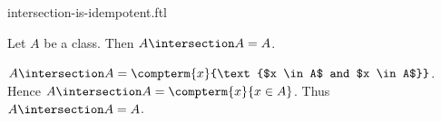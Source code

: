 \documentclass{article}
\begin{document}
\begin{smodule}[creators={Marcel Schütz}]{intersection-is-idempotent.ftl}

  \begin{fproposition*}[label=5333724497444864]
    Let $A$ be a class.
    Then $A \intersection A = A$.
  \end{fproposition*}
  \begin{fproof}
    $A \intersection A = \compterm{x}{\text{$x \in A$ and $x \in A$}}$.
    Hence $A \intersection A = \compterm{x}{x \in A}$.
    Thus $A \intersection A = A$.
  \end{fproof}
\end{smodule}
\end{document}
